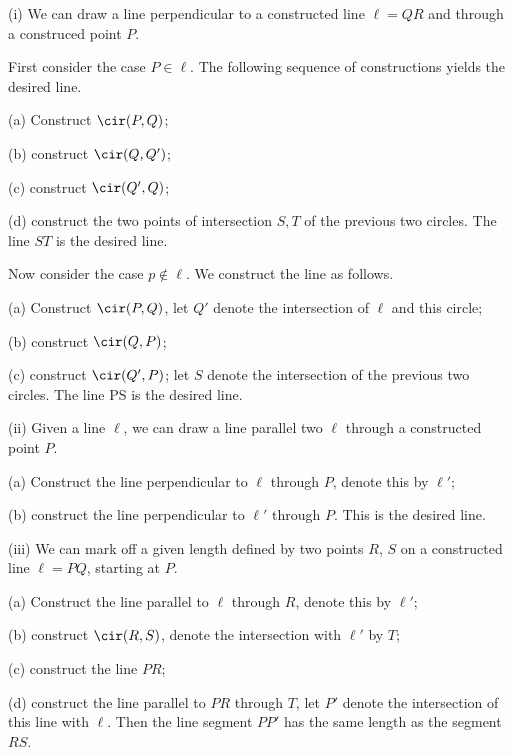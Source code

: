 \begin{example}
\ben
\item [(i)] We can draw a line perpendicular to a constructed line $\ell = QR$ and through a construced point $P$.

First consider the case $P \in \ell$. The following sequence of constructions yields the desired line.
\ben
\item [(a)] Construct $\cir(P,Q)$;
\item [(b)] construct $\cir(Q,Q')$;
\item [(c)] construct $\cir(Q',Q)$;
\item [(d)] construct the two points of intersection $S, T$ of the previous two circles. The line $ST$ is the desired line.
\een

Now consider the case $p \notin \ell$. We construct the line as follows.
\ben
\item [(a)] Construct $\cir(P,Q)$, let $Q'$ denote the intersection of $\ell$ and this circle;
\item [(b)] construct $\cir(Q, P)$;
\item [(c)]  construct $\cir(Q', P)$; let $S$ denote the intersection of the previous two circles. The line PS is the desired line.
\een

\item [(ii)] Given a line $\ell$, we can draw a line parallel two $\ell$ through a constructed point $P$.
\ben
\item [(a)] Construct the line perpendicular to $\ell$ through $P$, denote this by $\ell'$;
\item [(b)] construct the line perpendicular to $\ell'$ through $P$. This is the desired line.
\een

\item [(iii)] We can mark off a given length defined by two points $R$, $S$ on a constructed line $\ell = PQ$, starting at $P$.
\ben
\item [(a)] Construct the line parallel to $\ell$ through $R$, denote this by $\ell'$;
\item [(b)] construct $\cir(R, S)$, denote the intersection with $\ell'$ by $T$;
\item [(c)] construct the line $PR$;
\item [(d)] construct the line parallel to $PR$ through $T$, let $P'$ denote the intersection of this line with $\ell$. Then the line segment $PP'$ has the same length as the segment $RS$.
\een
\een
\end{example}

